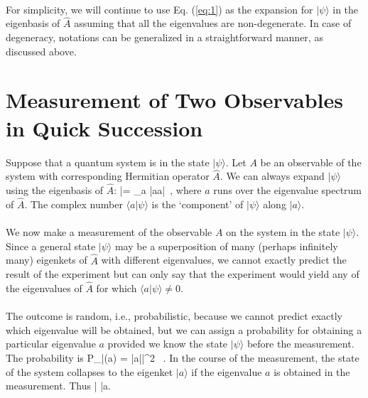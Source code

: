 \paragraph{}
For simplicity, we will continue to use Eq. (\ref{eq:1}) as the expansion for $|\psi\rangle$ in the eigenbasis of $\hat{A}$
assuming that all the eigenvalues are non-degenerate. In case of degeneracy, notations can be generalized in a straightforward manner, as discussed above.			



\section{Measurement of Two Observables in Quick Succession}
Suppose that a quantum system is in the state $|\psi\rangle$. Let $A$ be an observable of the system with corresponding Hermitian operator $\hat{A}$. We can always expand $|\psi\rangle$ using the eigenbasis of $\hat{A}$:
\be
|\psi\rangle = \sum_a |a\rangle \langle a|\psi\rangle \, ,
\ee
where $a$ runs over the eigenvalue spectrum of $\hat{A}$. The complex number $\langle a |\psi\rangle$ is the `component' of 
$|\psi\rangle$ along $|a\rangle$. 

\paragraph{}
We now make a measurement of the observable $A$ on the system in the state $|\psi\rangle$. Since a general state $|\psi\rangle$
may be a superposition of many (perhaps infinitely many) eigenkets of $\hat{A}$ with different eigenvalues, we cannot exactly 
predict the result of the experiment but can only say that the experiment would yield any of the eigenvalues 
of $\hat{A}$ for which $\langle a|\psi\rangle \neq 0$. 

\paragraph{}
The outcome is random, i.e., probabilistic, because we cannot predict exactly which eigenvalue will be obtained, but we can assign a probability for obtaining a particular eigenvalue $a$ provided we know the state $|\psi\rangle$ before the measurement.
The probability is
\be
P_{|\psi\rangle}(a) = \left|\langle a|\psi\rangle \right|^2 \, . 
\ee
In the course of the measurement, the state of the system collapses to the eigenket $|a\rangle$ if the eigenvalue $a$ is obtained in the measurement. Thus
\be
|\psi\rangle\;\; \;\; |a\rangle.
\ee


